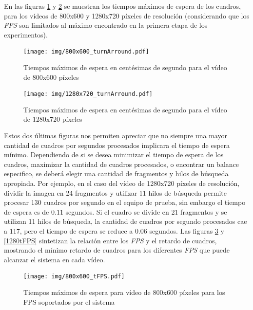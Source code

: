 En las figuras \ref{800turnArround} y \ref{1280turnArround} se muestran los
tiempos máximos de espera de los cuadros, para los vídeos de 800x600 y 1280x720
píxeles de resolución (considerando que los \emph{FPS} son limitados al máximo
encontrado en la primera etapa de los experimentos).

\begin{figure}[h]

	\texttt{[image: img/800x600\_turnArround.pdf]}
	\caption{Tiempos máximos de espera en centésimas de segundo para el
	vídeo de 800x600 píxeles}
	\label{800turnArround}

\end{figure}


\begin{figure}[h]

	\texttt{[image: img/1280x720\_turnArround.pdf]}
	\caption{Tiempos máximos de espera en centésimas de segundo para el
	vídeo de 1280x720 píxeles}
	\label{1280turnArround}

\end{figure}

Estos dos últimas figuras nos permiten apreciar que no siempre una mayor
cantidad de cuadros por segundos procesados implicara el tiempo de espera
mínimo. Dependiendo de si se desea minimizar el tiempo de espera de los cuadros,
maximizar la cantidad de cuadros procesados, o encontrar un balance especifico,
se deberá elegir una cantidad de fragmentos y hilos de búsqueda apropiada. Por
ejemplo, en el caso del vídeo de 1280x720 píxeles de resolución, dividir la
imagen en 24 fragmentos y utilizar 11 hilos de búsqueda permite procesar 130
cuadros por segundo en el equipo de prueba, sin embargo el tiempo de espera es
de $0.11$ segundos. Si el cuadro se divide en 21 fragmentos y se utilizan 11
hilos de búsqueda, la cantidad de cuadros por segundo procesados cae a 117, pero
el tiempo de espera se reduce a $0.06$ segundos. Las figuras \ref{800tFPS} y
\ref{1280tFPS} sintetizan la relación entre los \emph{FPS} y el retardo de
cuadros, mostrando el mínimo retardo de cuadros para los diferentes \emph{FPS}
que puede alcanzar el sistema en cada vídeo.

\begin{figure}[h]

	\texttt{[image: img/800x600\_tFPS.pdf]}
	\caption{Tiempos máximos de espera para vídeo de 800x600 píxeles para
	los FPS soportados por el sistema}
	\label{800tFPS}

\end{figure}

